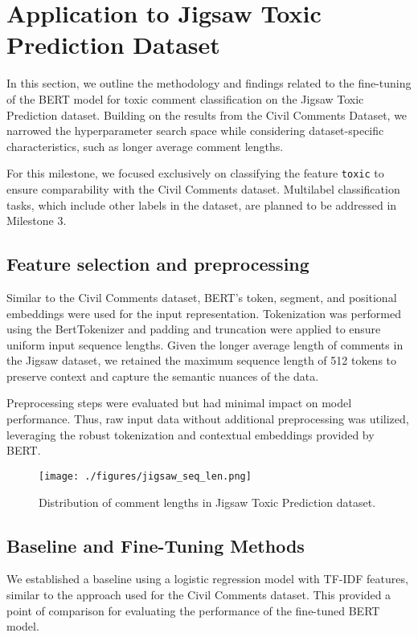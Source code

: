 \section{Application to Jigsaw Toxic Prediction Dataset}\label{sec:jigsaw}

In this section, we outline the methodology and findings related to the fine-tuning of the BERT model for toxic comment classification on the Jigsaw Toxic Prediction dataset. Building on the results from the Civil Comments Dataset, we narrowed the hyperparameter search space while considering dataset-specific characteristics, such as longer average comment lengths.

For this milestone, we focused exclusively on classifying the feature \texttt{toxic} to ensure comparability with the Civil Comments dataset. Multilabel classification tasks, which include other labels in the dataset, are planned to be addressed in Milestone 3.

\subsection{Feature selection and preprocessing}

Similar to the Civil Comments dataset, BERT's token, segment, and positional embeddings were used for the input representation. Tokenization was performed using the BertTokenizer and padding and truncation were applied to ensure uniform input sequence lengths. Given the longer average length of comments in the Jigsaw dataset, we retained the maximum sequence length of 512 tokens to preserve context and capture the semantic nuances of the data.

Preprocessing steps were evaluated but had minimal impact on model performance. Thus, raw input data without additional preprocessing was utilized, leveraging the robust tokenization and contextual embeddings provided by BERT.

\begin{figure}[ht] \centering \texttt{[image: ./figures/jigsaw\_seq\_len.png]} \caption{Distribution of comment lengths in Jigsaw Toxic Prediction dataset.} \label{fig:seq_len} \end{figure}

\subsection{Baseline and Fine-Tuning Methods}

We established a baseline using a logistic regression model with TF-IDF features, similar to the approach used for the Civil Comments dataset. This provided a point of comparison for evaluating the performance of the fine-tuned BERT model.

